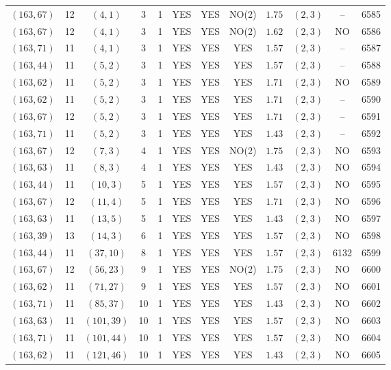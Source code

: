 \begin{longtable}{|c|c|c|c|c|c|c|c|c|c|c|c|}
$(163,67)$ & 12 & $(4,1)$ & 3 & 1 & YES & YES & NO(2) & $1.75$ & $(2,3)$ & -- & 6585\\
$(163,67)$ & 12 & $(4,1)$ & 3 & 1 & YES & YES & NO(2) & $1.62$ & $(2,3)$ & NO & 6586\\
$(163,71)$ & 11 & $(4,1)$ & 3 & 1 & YES & YES & YES & $1.57$ & $(2,3)$ & -- & 6587\\
$(163,44)$ & 11 & $(5,2)$ & 3 & 1 & YES & YES & YES & $1.57$ & $(2,3)$ & -- & 6588\\
$(163,62)$ & 11 & $(5,2)$ & 3 & 1 & YES & YES & YES & $1.71$ & $(2,3)$ & NO & 6589\\
$(163,62)$ & 11 & $(5,2)$ & 3 & 1 & YES & YES & YES & $1.71$ & $(2,3)$ & -- & 6590\\
$(163,67)$ & 12 & $(5,2)$ & 3 & 1 & YES & YES & YES & $1.71$ & $(2,3)$ & -- & 6591\\
$(163,71)$ & 11 & $(5,2)$ & 3 & 1 & YES & YES & YES & $1.43$ & $(2,3)$ & -- & 6592\\
$(163,67)$ & 12 & $(7,3)$ & 4 & 1 & YES & YES & NO(2) & $1.75$ & $(2,3)$ & NO & 6593\\
$(163,63)$ & 11 & $(8,3)$ & 4 & 1 & YES & YES & YES & $1.43$ & $(2,3)$ & NO & 6594\\
$(163,44)$ & 11 & $(10,3)$ & 5 & 1 & YES & YES & YES & $1.57$ & $(2,3)$ & NO & 6595\\
$(163,67)$ & 12 & $(11,4)$ & 5 & 1 & YES & YES & YES & $1.71$ & $(2,3)$ & NO & 6596\\
$(163,63)$ & 11 & $(13,5)$ & 5 & 1 & YES & YES & YES & $1.43$ & $(2,3)$ & NO & 6597\\
$(163,39)$ & 13 & $(14,3)$ & 6 & 1 & YES & YES & YES & $1.57$ & $(2,3)$ & NO & 6598\\
$(163,44)$ & 11 & $(37,10)$ & 8 & 1 & YES & YES & YES & $1.57$ & $(2,3)$ & 6132 & 6599\\
$(163,67)$ & 12 & $(56,23)$ & 9 & 1 & YES & YES & NO(2) & $1.75$ & $(2,3)$ & NO & 6600\\
$(163,62)$ & 11 & $(71,27)$ & 9 & 1 & YES & YES & YES & $1.57$ & $(2,3)$ & NO & 6601\\
$(163,71)$ & 11 & $(85,37)$ & 10 & 1 & YES & YES & YES & $1.43$ & $(2,3)$ & NO & 6602\\
$(163,63)$ & 11 & $(101,39)$ & 10 & 1 & YES & YES & YES & $1.57$ & $(2,3)$ & NO & 6603\\
$(163,71)$ & 11 & $(101,44)$ & 10 & 1 & YES & YES & YES & $1.57$ & $(2,3)$ & NO & 6604\\
$(163,62)$ & 11 & $(121,46)$ & 10 & 1 & YES & YES & YES & $1.43$ & $(2,3)$ & NO & 6605\\

\end{longtable}
